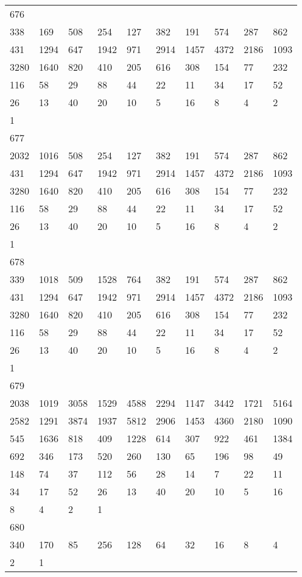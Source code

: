 \begin{longtable}{*{10}{l}}
676&&&&&&&&&\\
338& 169& 508& 254& 127& 382& 191& 574& 287& 862\\
431& 1294& 647& 1942& 971& 2914& 1457& 4372& 2186& 1093\\
3280& 1640& 820& 410& 205& 616& 308& 154& 77& 232\\
116& 58& 29& 88& 44& 22& 11& 34& 17& 52\\
26& 13& 40& 20& 10& 5& 16& 8& 4& 2\\
1& \\

677&&&&&&&&&\\
2032& 1016& 508& 254& 127& 382& 191& 574& 287& 862\\
431& 1294& 647& 1942& 971& 2914& 1457& 4372& 2186& 1093\\
3280& 1640& 820& 410& 205& 616& 308& 154& 77& 232\\
116& 58& 29& 88& 44& 22& 11& 34& 17& 52\\
26& 13& 40& 20& 10& 5& 16& 8& 4& 2\\
1& \\

678&&&&&&&&&\\
339& 1018& 509& 1528& 764& 382& 191& 574& 287& 862\\
431& 1294& 647& 1942& 971& 2914& 1457& 4372& 2186& 1093\\
3280& 1640& 820& 410& 205& 616& 308& 154& 77& 232\\
116& 58& 29& 88& 44& 22& 11& 34& 17& 52\\
26& 13& 40& 20& 10& 5& 16& 8& 4& 2\\
1& \\

679&&&&&&&&&\\
2038& 1019& 3058& 1529& 4588& 2294& 1147& 3442& 1721& 5164\\
2582& 1291& 3874& 1937& 5812& 2906& 1453& 4360& 2180& 1090\\
545& 1636& 818& 409& 1228& 614& 307& 922& 461& 1384\\
692& 346& 173& 520& 260& 130& 65& 196& 98& 49\\
148& 74& 37& 112& 56& 28& 14& 7& 22& 11\\
34& 17& 52& 26& 13& 40& 20& 10& 5& 16\\
8& 4& 2& 1& \\

680&&&&&&&&&\\
340& 170& 85& 256& 128& 64& 32& 16& 8& 4\\
2& 1& \\


\end{longtable}
